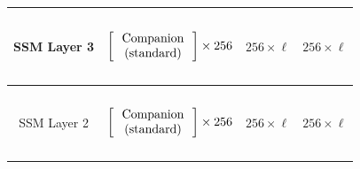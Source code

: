 \begin{table}[]
\begin{tabular}{@{}c|c|c|c@{}}
SSM Layer 3 & \begin{math}\begin{aligned}    \begin{matrix}    \text{\phantom{-}} \\    \end{matrix}    \\    \begin{bmatrix}    \text{\phantom{-} Companion \phantom{-}}   \\ \text{(standard)} \\    \end{bmatrix}    \times 256     \\    \begin{matrix}    \text{\phantom{-}} \\    \end{matrix}    \\\end{aligned}\end{math}                                                                                                                                                                                                                               & $256 \times \ell$ & $256 \times \ell$ \\ \midrule
SSM Layer 2 & \begin{math}\begin{aligned}    \begin{matrix}    \text{\phantom{-}} \\    \end{matrix}    \\    \begin{bmatrix}    \text{\phantom{-} Companion \phantom{-}}   \\ \text{(standard)} \\    \end{bmatrix}    \times 256     \\    \begin{matrix}    \text{\phantom{-}} \\    \end{matrix}    \\\end{aligned}\end{math}                                                                                                                                                                                                                               & $256 \times \ell$ & $256 \times \ell$ \\ \midrule

\end{tabular}
\end{table}
